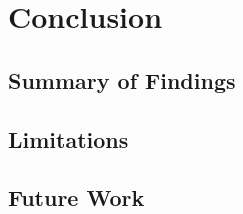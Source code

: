 \chapter{Conclusion}
\label{chap:conclusion}

\section{Summary of Findings}
\label{sec:concl-summary}

\section{Limitations}
\label{sec:concl-limitations}

\section{Future Work}
\label{sec:concl-future}
